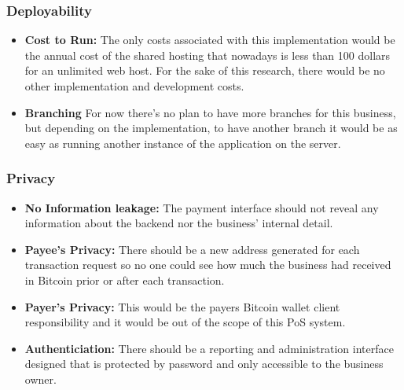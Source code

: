 \subsubsection{Deployability}
\begin{itemize}

\item \textbf{Cost to Run: } The only costs associated with this implementation would be the annual cost of the shared hosting that nowadays is less than 100 dollars for an unlimited web host. For the sake of this research, there would be no other implementation and development costs. 

\item \textbf{Branching} For now there's no plan to have more branches for this business, but depending on the implementation, to have another branch it would be as easy as running another instance of the application on the server.

\end{itemize}
 
\subsubsection{Privacy} 
\begin{itemize}

\item \textbf{No Information leakage: } The payment interface should not reveal any information about the backend nor the business' internal detail.

\item \textbf{Payee's Privacy: } There should be a new address generated for each transaction request so no one could see how much the business had received in Bitcoin prior or after each transaction.

\item \textbf{Payer's Privacy: } This would be the payers Bitcoin wallet client responsibility and it would be out of the scope of this PoS system.

\item \textbf{Authenticiation: } There should be a reporting and administration interface designed that is protected by password and only accessible to the business owner.

\end{itemize}
